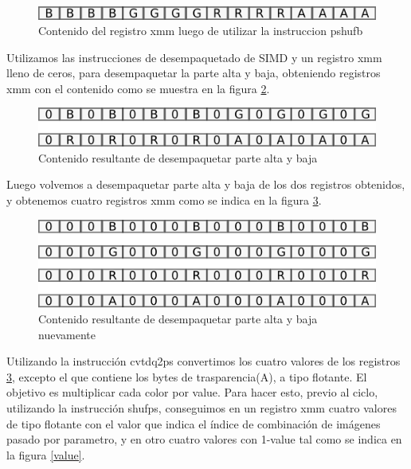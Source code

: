 \documentclass[a4paper]{article}
\begin{document}
\begin{figure}[H]
\centering
\includegraphics[scale=0.8]{imagenes/segundoXmm.png}
\caption{Contenido del registro xmm luego de utilizar la instruccion pshufb}
\label{segundoXmm}
\end{figure}

Utilizamos las instrucciones de desempaquetado de SIMD y un registro xmm lleno de ceros, para desempaquetar la parte alta y baja, obteniendo registros xmm con el contenido como se muestra en la figura \ref{tercerXmm}.


\begin{figure}[H]
\centering
\includegraphics[scale=0.8]{imagenes/tecerXmm.png}
\caption{Contenido resultante de desempaquetar parte alta y baja}
\label{tercerXmm}
\end{figure}

Luego volvemos a desempaquetar parte alta y baja de los dos registros obtenidos, y obtenemos cuatro registros xmm como se indica en la figura \ref{cuartoXmm}.


\begin{figure}[H]
\centering
\includegraphics[scale=0.8]{imagenes/cuartoXmm.png}
\caption{Contenido resultante de desempaquetar parte alta y baja nuevamente}
\label{cuartoXmm}
\end{figure}

Utilizando la instrucción cvtdq2ps convertimos los cuatro valores de los registros \ref{cuartoXmm}, excepto el que contiene los bytes de trasparencia(A), a tipo flotante. El objetivo es multiplicar cada color por value. Para hacer esto, previo al ciclo, utilizando la instrucción shufps, conseguimos en un registro xmm cuatro valores de tipo flotante con el valor que indica el índice de combinación de imágenes pasado por parametro, y en otro cuatro valores con 1-value tal como se indica en la figura \ref{value}.
\end{document}
